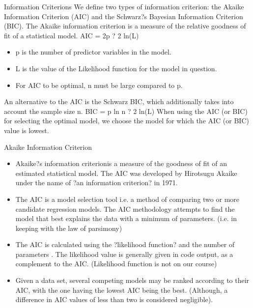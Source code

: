 Information Criterions
We define two types of information criterion: the Akaike Information Criterion (AIC) and the
Schwarz?s Bayesian Information Criterion (BIC). The Akaike information criterion is a measure
of the relative goodness of fit of a statistical model.
AIC = 2p ? 2 ln(L)


\begin{itemize}
	\item p is the number of predictor variables in the model.
	\item L is the value of the Likelihood function for the model in question.
	\item For AIC to be optimal, n must be large compared to p.
\end{itemize}

An alternative to the AIC is the Schwarz BIC, which additionally takes into account the
sample size n.
BIC = p ln n ? 2 ln(L)
When using the AIC (or BIC) for selecting the optimal model, we choose the model for which
the AIC (or BIC) value is lowest.


Akaike Information Criterion

\begin{itemize}
	\item Akaike?s information criterionis a measure of the goodness of fit of an estimated statistical
	model. The AIC was developed by Hirotsugu Akaike under the name of ?an information
	criterion? in 1971.
	\item The AIC is a model selection tool i.e. a method of comparing two or more candidate
	regression models. The AIC methodology attempts to find the model that best explains
	the data with a minimum of parameters. (i.e. in keeping with the law of parsimony)
	\item The AIC is calculated using the ?likelihood function? and the number of parameters .
	The likelihood value is generally given in code output, as a complement to the AIC.
	(Likelihood function is not on our course)
	\item Given a data set, several competing models may be ranked according to their AIC, with
	the one having the lowest AIC being the best. (Although, a difference in AIC values of
	less than two is considered negligible).
	
\end{itemize}
